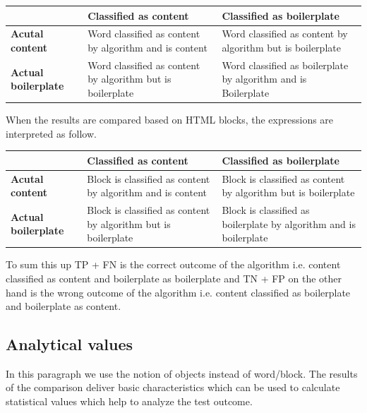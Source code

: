  \begin{table}[h]
\begin{tabular}{|p{4cm} |p{5.5cm} |p{5.5cm} |}
\hline         								& \textbf{Classified as content} 				& \textbf{Classified as boilerplate} 					\\ \hline
\textbf{Acutal content} 				& Word classified as content by algorithm and is content		& Word classified as content by algorithm but is boilerplate		\\ \hline
\textbf{Actual boilerplate} 			& Word classified as content by algorithm but is boilerplate 	& Word classified as boilerplate by algorithm and is Boilerplate	\\ \hline
\end{tabular}
\end{table}

When the results are compared based on HTML blocks, the expressions are interpreted as follow.

 \begin{table}[h]
\begin{tabular}{|p{4cm} |p{5.5cm} |p{5.5cm} |}
\hline         							& \textbf{Classified as content} 								& \textbf{Classified as boilerplate} 								\\ \hline
\textbf{Acutal content} 				& Block is classified as content by algorithm and is content		& Block is classified as content by algorithm but is boilerplate		\\ \hline
\textbf{Actual boilerplate} 			& Block is classified as content by algorithm but is boilerplate 	& Block is classified as boilerplate by algorithm and is boilerplate	\\ \hline
\end{tabular}
\end{table}

To sum this up TP + FN is the correct outcome of the algorithm i.e. content classified as content and boilerplate as boilerplate and TN + FP on the other hand is the wrong outcome of the algorithm i.e. content classified as boilerplate and boilerplate as content.



\subsection{Analytical values}
\label{subsec:Analytical values}

In this paragraph we use the notion of objects instead of word/block.
The results of the comparison deliver basic characteristics which can be used to calculate statistical values which help to analyze the test outcome.
										
